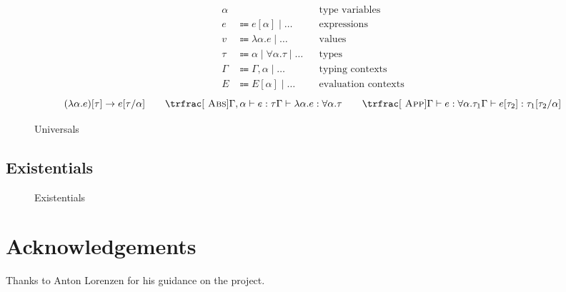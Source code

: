 \documentclass[nonacm]{acmart}
\begin{document}
\begin{figure}
  \begin{framed}
    \begin{align*}
      \alpha & && \text{type variables} \\
      e & \Coloneqq e [\alpha] \mid \dots && \text{expressions} \\
      v & \Coloneqq \lambda \alpha . e \mid \dots && \text{values} \\
      \tau & \Coloneqq \alpha \mid \forall \alpha . \tau \mid \dots && \text{types} \\
      \Gamma & \Coloneqq \Gamma, \alpha \mid \dots && \text{typing contexts} \\
      E & \Coloneqq E [\alpha] \mid \dots && \text{evaluation contexts}
    \end{align*}
    \[
      (\lambda \alpha . e)[\tau] \rightarrow e[\tau / \alpha]
        \qquad
      \trfrac[~\textsc{Abs}]{\Gamma, \alpha \vdash e : \tau}{\Gamma \vdash \lambda \alpha . e : \forall \alpha . \tau}
        \qquad
      \trfrac[~\textsc{App}]{\Gamma \vdash e : \forall \alpha . \tau_1}{\Gamma \vdash e [\tau_2] : \tau_1[\tau_2 / \alpha]}
    \]
  \end{framed}
  \caption{Universals}\label{fig:universals}
\end{figure}

\subsection{Existentials}

\begin{figure}
  \begin{framed}
  \end{framed}
  \caption{Existentials}\label{fig:existentials}
\end{figure}

\section{Acknowledgements}

Thanks to Anton Lorenzen for his guidance on the project.
\end{document}
